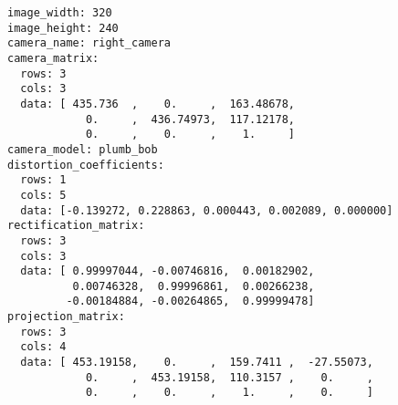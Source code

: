 \begin{lstlisting}[caption=YAML de la calibración de la cámara derecha mediante ROS, label=lst:rightcamerayaml]
image_width: 320
image_height: 240
camera_name: right_camera
camera_matrix:
  rows: 3
  cols: 3
  data: [ 435.736  ,    0.     ,  163.48678,
            0.     ,  436.74973,  117.12178,
            0.     ,    0.     ,    1.     ]
camera_model: plumb_bob
distortion_coefficients:
  rows: 1
  cols: 5
  data: [-0.139272, 0.228863, 0.000443, 0.002089, 0.000000]
rectification_matrix:
  rows: 3
  cols: 3
  data: [ 0.99997044, -0.00746816,  0.00182902,
          0.00746328,  0.99996861,  0.00266238,
         -0.00184884, -0.00264865,  0.99999478]
projection_matrix:
  rows: 3
  cols: 4
  data: [ 453.19158,    0.     ,  159.7411 ,  -27.55073,
            0.     ,  453.19158,  110.3157 ,    0.     ,
            0.     ,    0.     ,    1.     ,    0.     ]
\end{lstlisting}